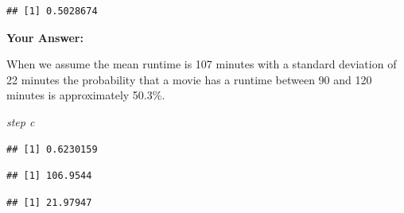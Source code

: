 \documentclass[
]{article}
\newenvironment{Shaded}{\begin{snugshade}}{\end{snugshade}}
\newcommand{\AttributeTok}[1]{\textcolor[rgb]{0.13,0.29,0.53}{#1}}
\newcommand{\ConstantTok}[1]{\textcolor[rgb]{0.56,0.35,0.01}{#1}}
\newcommand{\DecValTok}[1]{\textcolor[rgb]{0.00,0.00,0.81}{#1}}
\newcommand{\FunctionTok}[1]{\textcolor[rgb]{0.13,0.29,0.53}{\textbf{#1}}}
\newcommand{\NormalTok}[1]{#1}
\newcommand{\OtherTok}[1]{\textcolor[rgb]{0.56,0.35,0.01}{#1}}
\newcommand{\SpecialCharTok}[1]{\textcolor[rgb]{0.81,0.36,0.00}{\textbf{#1}}}
\newcommand{\StringTok}[1]{\textcolor[rgb]{0.31,0.60,0.02}{#1}}
\begin{document}
\begin{verbatim}
## [1] 0.5028674
\end{verbatim}

\textbf{Your Answer:}

When we assume the mean runtime is 107 minutes with a standard deviation
of 22 minutes the probability that a movie has a runtime between 90 and
120 minutes is approximately 50.3\%.

\emph{step c}

\begin{Shaded}
\end{Shaded}

\begin{verbatim}
## [1] 0.6230159
\end{verbatim}

\begin{Shaded}
\end{Shaded}

\begin{verbatim}
## [1] 106.9544
\end{verbatim}

\begin{Shaded}
\end{Shaded}

\begin{verbatim}
## [1] 21.97947
\end{verbatim}

\begin{Shaded}
\end{Shaded}
\end{document}
